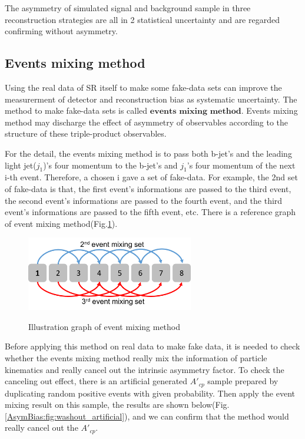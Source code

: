 		The asymmetry of simulated signal and background sample in three reconstruction strategies are all in 2 statistical uncertainty and are regarded confirming without asymmetry.

	\subsection{Events mixing method}
	\label{ssec:evts_mixing}

		Using the real data of SR itself to make some fake-data sets can improve the measurerment of detector and reconstruction bias as systematic uncertainty. The method to make fake-data sets is called $\textbf{events mixing method}$. Events mixing method may discharge the effect of asymmetry of observables according to the structure of these triple-product observables.

		For the detail, the events mixing method is to pass both b-jet's and the leading light jet($j_1$)'s four momentum to the b-jet's and $j_1$'s four momentum of the next i-th event. Therefore, a chosen i gave a set of fake-data. For example, the 2nd set of fake-data is that, the first event's informations are passed to the third event, the second event's informations are passed to the fourth event, and the third event's informations are passed to the fifth event, etc. There is a reference graph of event mixing method(Fig.\ref{AsymBias:fig:event_mixing}).

		\begin{figure}[H]
		\centering{}
	    	\includegraphics[width=0.65\textwidth]{Figures/Asym/event_mixing.pdf}\\
		\caption{Illustration graph of event mixing method}
		\label{AsymBias:fig:event_mixing}
		\end{figure}
		\FloatBarrier

		Before applying this method on real data to make fake data, it is needed to check whether the events mixing method really mix the information of particle kinematics and really cancel out the intrinsic asymmetry factor. To check the canceling out effect, there is an artificial generated $A'_{cp}$ sample prepared by duplicating random positive events with given probability. Then apply the event mixing result on this sample, the results are shown below(Fig.\ref{AsymBias:fig:washout_artificial}), and we can confirm that the method would really cancel out the $A'_{cp}$.

